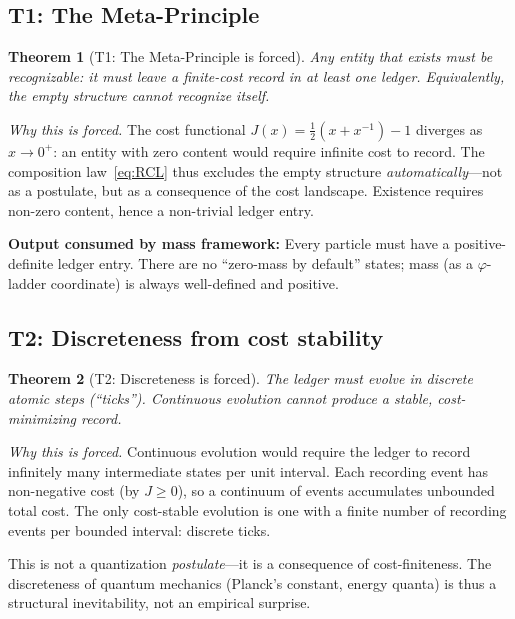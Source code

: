 \documentclass[11pt,a4paper]{article}
\newtheorem{theorem}{Theorem}[section]
\theoremstyle{definition}
\theoremstyle{remark}
\newcommand{\phig}{\varphi}
\newcommand{\Jcost}{J}
\begin{document}
\subsection{T1: The Meta-Principle}

\begin{theorem}[T1: The Meta-Principle is forced]
\label{thm:T1}
Any entity that exists must be recognizable: it must leave a finite-cost record
in at least one ledger.  Equivalently, the empty structure cannot recognize
itself.
\end{theorem}

\noindent\textit{Why this is forced.}\quad
The cost functional $\Jcost(x) = \tfrac{1}{2}(x + x^{-1}) - 1$ diverges as
$x \to 0^+$: an entity with zero content would require infinite cost to record.
The composition law~\eqref{eq:RCL} thus excludes the empty structure
\emph{automatically}---not as a postulate, but as a consequence of the cost
landscape.  Existence requires non-zero content, hence a non-trivial ledger
entry.

\medskip
\noindent\textbf{Output consumed by mass framework:}
Every particle must have a positive-definite ledger entry.  There are no
``zero-mass by default'' states; mass (as a $\phig$-ladder coordinate) is
always well-defined and positive.

\subsection{T2: Discreteness from cost stability}

\begin{theorem}[T2: Discreteness is forced]
\label{thm:T2}
The ledger must evolve in discrete atomic steps (``ticks'').  Continuous
evolution cannot produce a stable, cost-minimizing record.
\end{theorem}

\noindent\textit{Why this is forced.}\quad
Continuous evolution would require the ledger to record infinitely many
intermediate states per unit interval.  Each recording event has non-negative
cost (by $\Jcost \geq 0$), so a continuum of events accumulates unbounded
total cost.  The only cost-stable evolution is one with a finite number of
recording events per bounded interval: discrete ticks.

This is not a quantization \emph{postulate}---it is a consequence of
cost-finiteness.  The discreteness of quantum mechanics (Planck's constant,
energy quanta) is thus a structural inevitability, not an empirical surprise.
\end{document}
